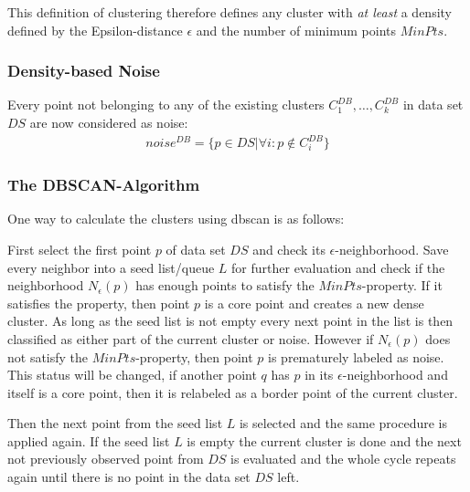 This definition of clustering therefore defines any cluster with \textit{at least} a density defined by the Epsilon-distance $\epsilon$ and the number of minimum points $MinPts$.

\subsubsection*{Density-based Noise}
Every point not belonging to any of the existing clusters $C^{DB}_1, \dotsc, C^{DB}_k$ in data set $DS$ are now considered as noise: 
\begin{align}
    noise^{DB} = \{p \in  DS | \forall i : p \notin C^{DB}_i\}
\end{align}

\subsubsection*{The DBSCAN-Algorithm}
One way to calculate the clusters using \gls{dbscan} is as follows:

First select the first point $p$ of data set $DS$ and check its $\epsilon$-neighborhood. Save every neighbor into a seed list/queue $L$ for further evaluation and check if the neighborhood $N_{\epsilon}(p)$ has enough points to satisfy the $MinPts$-property. 
If it satisfies the property, then point $p$ is a core point and creates a new dense cluster. As long as the seed list is not empty every next point in the list is then classified as either part of the current cluster or noise.
However if $N_{\epsilon}(p)$ does not satisfy the $MinPts$-property, then point $p$ is prematurely labeled as noise. This status will be changed, if another point $q$ has $p$ in its $\epsilon$-neighborhood and itself is a core point, then it is relabeled as a border point of the current cluster.

Then the next point from the seed list $L$ is selected and the same procedure is applied again.
If the seed list $L$ is empty the current cluster is done and the next not previously observed point from $DS$ is evaluated and the whole cycle repeats again until there is no point in the data set $DS$ left.

